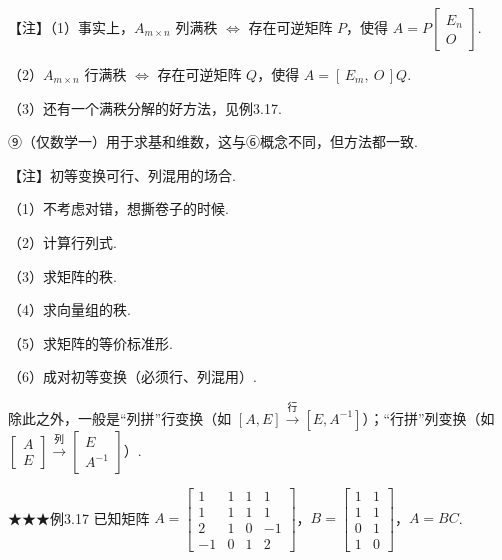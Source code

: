 \begin{fnote}
【注】（1）事实上，$A_{m\times n}$ 列满秩 $\Leftrightarrow$ 存在可逆矩阵 $P$，使得 $A=P\begin{bmatrix}E_n\\O\end{bmatrix}$.

（2）$A_{m\times n}$ 行满秩 $\Leftrightarrow$ 存在可逆矩阵 $Q$，使得 $A=[\,E_m,\ O\,]Q$.

（3）还有一个满秩分解的好方法，见例3.17.
\end{fnote}

⑨（仅数学一）用于求基和维数，这与⑥概念不同，但方法都一致.

\begin{fnote}
【注】初等变换可行、列混用的场合.

（1）不考虑对错，想撕卷子的时候.

（2）计算行列式.

（3）求矩阵的秩.

（4）求向量组的秩.

（5）求矩阵的等价标准形.

（6）成对初等变换（必须行、列混用）.

除此之外，一般是“列拼”行变换（如 $[A,E]\xrightarrow{\text{行}}[E,A^{-1}]$）；“行拼”列变换（如 $\begin{bmatrix}A\\E\end{bmatrix}\xrightarrow{\text{列}}\begin{bmatrix}E\\A^{-1}\end{bmatrix}$）.
\end{fnote}

\begin{fcard}{★★★例3.17}
已知矩阵 $A=\begin{bmatrix}1&1&1&1\\1&1&1&1\\2&1&0&-1\\-1&0&1&2\end{bmatrix}$，$B=\begin{bmatrix}1&1\\1&1\\0&1\\1&0\end{bmatrix}$，$A=BC$.

\end{fcard}

